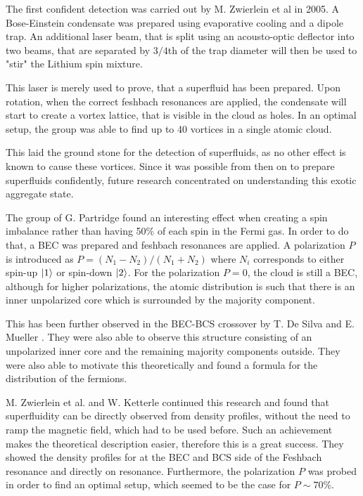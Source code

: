 The first confident detection was carried out by M. Zwierlein et al in 2005. A Bose-Einstein condensate was prepared using evaporative cooling and a dipole trap. An additional laser beam, that is split using an acousto-optic deflector into two beams, that are separated by $3/4$th of the trap diameter will then be used to "stir" the Lithium spin mixture.

This laser is merely used to prove, that a superfluid has been prepared. Upon rotation, when the correct feshbach resonances are applied, the condensate will start to create a vortex lattice, that is visible in the cloud as holes. In an optimal setup, the group was able to find up to 40 vortices in a single atomic cloud.

This laid the ground stone for the detection of superfluids, as no other effect is known to cause these vortices.
Since it was possible from then on to prepare superfluids confidently, future research concentrated on understanding this exotic aggregate state.

The group of G. Partridge found an interesting effect when creating a spin imbalance rather than having 50\% of each spin in the Fermi gas. In order to do that, a BEC was prepared and feshbach resonances are applied. A polarization $P$ is introduced as $P=\left( N_1-N_2\right) / \left( N_1+N_2\right)$ where $N_i$ corresponds to either spin-up $\ket{1}$ or spin-down $\ket{2}$. For the polarization $P=0$, the cloud is still a BEC, although for higher polarizations, the atomic distribution is such that there is an inner unpolarized core which is surrounded by the majority component.

This has been further observed in the BEC-BCS crossover by T. De Silva and E. Mueller . They were also able to observe this structure consisting of an unpolarized inner core and the remaining majority components outside. They were also able to motivate this theoretically and found a formula for the distribution of the fermions.

M. Zwierlein et al. and W. Ketterle  continued this research and found that superfluidity can be directly observed from density profiles, without the need to ramp the magnetic field, which had to be used before. Such an achievement makes the theoretical description easier, therefore this is a great success.
They showed the density profiles for at the BEC and BCS side of the Feshbach resonance and directly on resonance. Furthermore, the polarization $P$ was probed in order to find an optimal setup, which seemed to be the case for $P \sim 70\%$.

